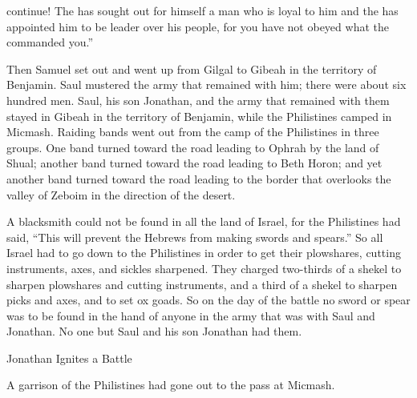 {continue! The
{}
has sought
out for himself
a man
who is loyal
to him
and the
{}
has appointed
him to be leader
over
his people,
for
you have not
obeyed
what
the
{}
commanded you.”
\par }{\PP {}Then
Samuel
set out and went up
from
Gilgal
to Gibeah
in the territory of Benjamin.
Saul
mustered
the army
that remained
with
him; there were about six
hundred
men.
Saul,
his son
Jonathan,
and the army
that remained
with
them stayed
in Gibeah
in the territory of Benjamin,
while the Philistines
camped
in Micmash.
Raiding bands
went out
from the camp
of the Philistines
in three
groups.
One
band
turned
toward
the road
leading to Ophrah
by the land
of Shual;
another band
turned
toward the road
leading to Beth Horon;
and yet another band
turned
toward the road
leading to the border
that overlooks
the valley
of Zeboim
in the direction of the desert.
\par }{\PP {}A blacksmith
could not
be found
in all
the land
of Israel,
for
the Philistines
had
said,
“This will prevent
the Hebrews
from making swords
and
spears.”
So all
Israel
had to go down
to the Philistines
in order to get their plowshares,
cutting instruments,
axes,
and sickles
sharpened.
They charged two-thirds of a shekel
to sharpen
plowshares
and cutting instruments,
and a third
of a shekel to sharpen picks
and axes,
and to set
ox goads.
So
on the day
of the battle
no
sword
or spear
was to be found
in the hand
of anyone
in the army
that
was with
Saul
and
Jonathan.
No
one but Saul
and his son
Jonathan had them.
\par }{\SH Jonathan Ignites a Battle
\par }{\PP {}A garrison
of the Philistines
had gone out to
the pass
at Micmash.

}
